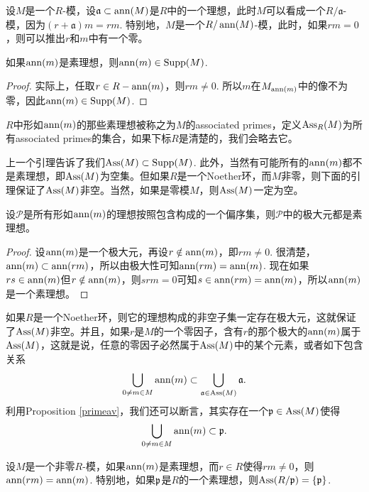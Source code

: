 设$M$是一个$R$-模，设$\mathfrak{a}\subset \operatorname{ann}(M)$是$R$中的一个理想，此时$M$可以看成一个$R/\mathfrak{a}$-模，因为$(r+\mathfrak{a})m=rm$. 特别地，$M$是一个$R/\operatorname{ann}(M)$-模，此时，如果$rm=0$，则可以推出$r$和$m$中有一个零。

\begin{lem}
	如果$\operatorname{ann}(m)$是素理想，则$\operatorname{ann}(m)\in \operatorname{Supp}(M)$.
\end{lem}

\begin{proof}
	实际上，任取$r\in R-\operatorname{ann}(m)$，则$rm\neq 0$. 所以$m$在$M_{\operatorname{ann}(m)}$中的像不为零，因此$\operatorname{ann}(m)\in \operatorname{Supp}(M)$.
\end{proof}

\para $R$中形如$\operatorname{ann}(m)$的那些素理想被称之为$M$的associated primes，定义$\operatorname{Ass}_R(M)$为所有associated primes的集合，如果下标$R$是清楚的，我们会略去它。
\endpara

上一个引理告诉了我们$\operatorname{Ass}(M)\subset \operatorname{Supp}(M)$. 此外，当然有可能所有的$\operatorname{ann}(m)$都不是素理想，即$\operatorname{Ass}(M)$为空集。但如果$R$是一个Noether环，而$M$非零，则下面的引理保证了$\operatorname{Ass}(M)$非空。当然，如果是零模$M$，则$\operatorname{Ass}(M)$一定为空。

\begin{lem}
设$\mathcal{P}$是所有形如$\operatorname{ann}(m)$的理想按照包含构成的一个偏序集，则$\mathcal{P}$中的极大元都是素理想。
\end{lem}

\begin{proof}
	设$\operatorname{ann}(m)$是一个极大元，再设$r\notin \operatorname{ann}(m)$，即$rm\neq 0$. 很清楚，$\operatorname{ann}(m)\subset \operatorname{ann}(rm)$，所以由极大性可知$\operatorname{ann}(rm)=\operatorname{ann}(m)$. 现在如果$rs\in \operatorname{ann}(m)$但$r\notin \operatorname{ann}(m)$，则$srm=0$可知$s\in \operatorname{ann}(rm)=\operatorname{ann}(m)$，所以$\operatorname{ann}(m)$是一个素理想。
\end{proof}

如果$R$是一个Noether环，则它的理想构成的非空子集一定存在极大元，这就保证了$\operatorname{Ass}(M)$非空。并且，如果$r$是$M$的一个零因子，含有$r$的那个极大的$\operatorname{ann}(m)$属于$\operatorname{Ass}(M)$，这就是说，任意的零因子必然属于$\operatorname{Ass}(M)$中的某个元素，或者如下包含关系
\[
	\bigcup_{0\neq m\in M}\operatorname{ann}(m)\subset \bigcup_{\mathfrak{a}\in \operatorname{Ass}(M)}\mathfrak{a}. 
\]
利用Proposition \ref{primeav}，我们还可以断言，其实存在一个$\mathfrak{p}\in \operatorname{Ass}(M)$使得
\[
	\bigcup_{0\neq m\in M}\operatorname{ann}(m)\subset \mathfrak{p}.
\]

\begin{lem}
设$M$是一个非零$R$-模，如果$\operatorname{ann}(m)$是素理想，而$r\in R$使得$rm\neq 0$，则$\operatorname{ann}(rm)=\operatorname{ann}(m)$. 特别地，如果$\mathfrak{p}$是$R$的一个素理想，则$\operatorname{Ass}(R/\mathfrak{p})=\{\mathfrak{p}\}$.
\end{lem}

